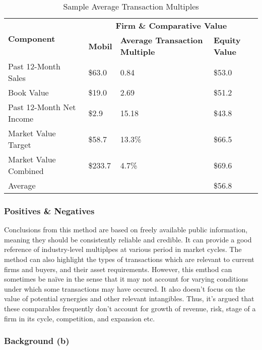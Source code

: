 \documentclass[11pt, english]{article}
\begin{document}
	\begin{table}[h]
                \scriptsize
                \renewcommand{\arraystretch}{1.25}
        \begin{center}
	\begin{tabular}{p{3.5cm}|p{2cm}p{4.5cm}|p{2cm}}
		\multirow{2}{*}{\textbf{Component}} & \multicolumn{3}{c}{\textbf{Firm \& Comparative Value}}\\
		\cline{2-4}
		& \textbf{Mobil} & \textbf{Average Transaction Multiple} & \textbf{Equity Value}\\
		\hline
		Past 12-Month Sales & \$63.0 & 0.84 & \$53.0\\
		Book Value & \$19.0 & 2.69 & \$51.2\\
		Past 12-Month Net Income & \$2.9 & 15.18 & \$43.8\\
		Market Value Target & \$58.7 & 13.3\% & \$66.5\\
		Market Value Combined & \$233.7 & 4.7\% & \$69.6\\
		\cline{4-4}
		Average & \multicolumn{2}{c|}{} & \$56.8\\
		\hline
	\end{tabular}
                \caption{Sample Average Transaction Multiples}
        \end{center}
        \end{table}

		\subsubsection*{Positives \& Negatives}

	Conclusions from this method are based on freely available public information, meaning they should be consistently reliable and credible. It can provide a good reference of industry-level multiplpes at various period in market cycles. The method can also highlight the types of transactions which are relevant to current firms and buyers, and their asset requirements. However, this emthod can sometimes be na\"{i}ve in the sense that it may not account for varying conditions under which some transactions may have occured. It also doesn't focus on the value of potential synergies and other relevant intangibles. Thus, it's argued that these comparables frequently don't account for growth of revenue, risk, stage of a firm in its cycle, competition, and expansion etc.

		\subsubsection*{Background (b)}
\end{document}
